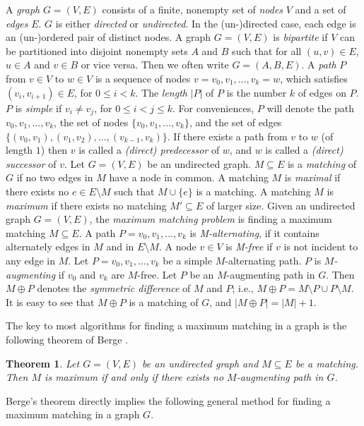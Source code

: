 \documentclass[12pt,twoside,a4paper]{article}
\newtheorem{theo}{Theorem}
\begin{document}
A {\em graph} $G=(V,E)$ consists of a finite, nonempty set of {\em nodes\/}
$V$ and a set of {\em edges\/} $E$. $G$ is either {\em directed\/} or
{\em undirected\/}. In the (un-)directed case, each edge is an (un-)ordered
pair of distinct nodes. 
A graph $G=(V,E)$ is {\em bipartite\/} if $V$ can be
partitioned into disjoint nonempty sets $A$ and $B$ such that for all
$(u,v)\in E$, $u\in A$ and $v\in B$ or vice versa. Then we often write 
$G=(A,B,E)$.
A {\em path\/} $P$ from $v\in V$ to $w\in V$ is a sequence of
nodes $v=v_0, v_1, \ldots,v_k=w$, which satisfies $(v_i,v_{i+1})\in E$, for
$0\leq i < k$.
The {\em length\/} $|P|$ of $P$ is the number $k$ of edges on $P$. $P$ is
{\em simple\/} if $v_i\not= v_j$, for $0\leq i<j\leq k$. For conveniences,
$P$ will denote the path $v_0, v_1,\ldots,v_k$, the set of nodes
$\{v_0,v_1,\ldots,v_k\}$, and the set of edges $\{(v_0,v_1),(v_1,v_2),
\ldots,(v_{k-1},v_k)\}$.
If there exists a path from $v$ to $w$ (of length $1$) then $v$ is called a
{\em (direct) predecessor\/} of $w$, and $w$ is called a {\em (direct) 
successor\/} of $v$.
Let $G =(V,E)$ be an undirected graph. $M\subseteq E$ is a
{\em matching\/} of $G$ if no two edges in $M$ have a node in common.
A matching $M$ is {\em maximal\/} if there exists no $e\in E\setminus M$ such
that $M\cup \{e\}$ is a matching. A matching $M$ is {\em maximum\/} if there
exists no matching $M'\subseteq E$ of larger size.
Given an undirected graph $G=(V,E)$, the {\em maximum matching problem\/} is
finding a maximum matching $M\subseteq E$.
A path $P=v_0,v_1,\ldots, v_k$ is {\em M-alternating\/}, if it contains 
alternately edges in $M$ and in $E \setminus M$.
A node $v\in V$ is {\em M-free\/} if $v$ is not incident to any edge in $M$. 
Let $P=v_0,v_1,\ldots,v_k$ be a simple $M$-alternating path. $P$ is
{\em $M$-augmenting} if $v_0$ and $v_k$ are $M$-free.
Let $P$ be an $M$-augmenting path in $G$. Then $M\oplus P$ denotes the
{\em symmetric difference\/} of $M$ and $P$; i.e., $M\oplus P = M\setminus  P
\cup  P\setminus M$.
It is easy to see that $M\oplus P$ is a matching of $G$, and $|M\oplus P| =
|M| + 1$.

The key to most algorithms for finding a maximum matching in a graph is the
following theorem of Berge \cite{Be}.

\begin{theo}
Let $G =(V,E)$ be an undirected graph and $M\subseteq E$ be a matching. Then
$M$ is maximum if and only if there exists no $M$-augmenting path in $G$.
\end{theo}
Berge's theorem directly implies the following general method for
finding a maximum matching in a graph $G$.
\end{document}
